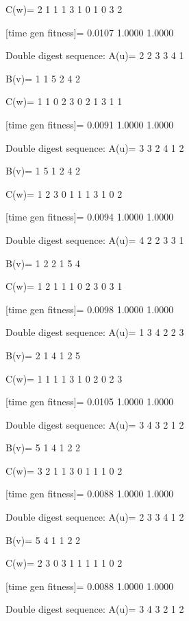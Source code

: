 C(w)=
     2     1     1     1     3     1     0     1     0     3     2

[time gen fitness]=
    0.0107    1.0000    1.0000

Double digest sequence:
A(u)=
     2     2     3     3     4     1

B(v)=
     1     1     5     2     4     2

C(w)=
     1     1     0     2     3     0     2     1     3     1     1

[time gen fitness]=
    0.0091    1.0000    1.0000

Double digest sequence:
A(u)=
     3     3     2     4     1     2

B(v)=
     1     5     1     2     4     2

C(w)=
     1     2     3     0     1     1     1     3     1     0     2

[time gen fitness]=
    0.0094    1.0000    1.0000

Double digest sequence:
A(u)=
     4     2     2     3     3     1

B(v)=
     1     2     2     1     5     4

C(w)=
     1     2     1     1     1     0     2     3     0     3     1

[time gen fitness]=
    0.0098    1.0000    1.0000

Double digest sequence:
A(u)=
     1     3     4     2     2     3

B(v)=
     2     1     4     1     2     5

C(w)=
     1     1     1     1     3     1     0     2     0     2     3

[time gen fitness]=
    0.0105    1.0000    1.0000

Double digest sequence:
A(u)=
     3     4     3     2     1     2

B(v)=
     5     1     4     1     2     2

C(w)=
     3     2     1     1     3     0     1     1     1     0     2

[time gen fitness]=
    0.0088    1.0000    1.0000

Double digest sequence:
A(u)=
     2     3     3     4     1     2

B(v)=
     5     4     1     1     2     2

C(w)=
     2     3     0     3     1     1     1     1     1     0     2

[time gen fitness]=
    0.0088    1.0000    1.0000

Double digest sequence:
A(u)=
     3     4     3     2     1     2

